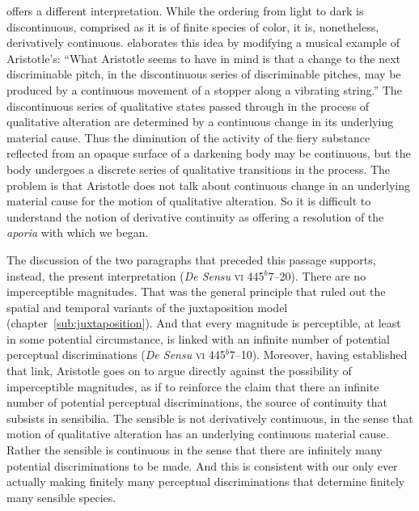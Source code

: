\citet[]{Sorabji:1976fk} offers a different interpretation. While the ordering from light to dark is discontinuous, comprised as it is of finite species of color, it is, nonetheless, derivatively continuous. \citet[80]{Sorabji:1976fk} elaborates this idea by modifying a musical example of Aristotle's: ``What Aristotle seems to have in mind is that a change to the next discriminable pitch, in the discontinuous series of discriminable pitches, may be produced by a continuous movement of a stopper along a vibrating string.'' The discontinuous series of qualitative states passed through in the process of qualitative alteration are determined by a continuous change in its underlying material cause. Thus the diminution of the activity of the fiery substance reflected from an opaque surface of a darkening body may be continuous, but the body undergoes a discrete series of qualitative transitions in the process. The problem is that Aristotle does not talk about continuous change in an underlying material cause for the motion of qualitative alteration. So it is difficult to understand the notion of derivative continuity as offering a resolution of the \emph{aporia} with which we began.

The discussion of the two paragraphs that preceded this passage supports, instead, the present interpretation (\emph{De Sensu} \textsc{vi} 445\( ^{b} \)7--20). There are no imperceptible magnitudes. That was the general principle that ruled out the spatial and temporal variants of the juxtaposition model (chapter~\ref{sub:juxtaposition}). And that every magnitude is perceptible, at least in some potential circumstance, is linked with an infinite number of potential perceptual discriminations (\emph{De Sensu} \textsc{vi} 445\( ^{b} \)7--10). Moreover, having established that link, Aristotle goes on to argue directly against the possibility of imperceptible magnitudes, as if to reinforce the claim that there an infinite number of potential perceptual discriminations, the source of continuity that subsists in sensibilia. The sensible is not derivatively continuous, in the sense that motion of qualitative alteration has an underlying continuous material cause. Rather the sensible is continuous in the sense that there are infinitely many potential discriminations to be made. And this is consistent with our only ever actually making finitely many perceptual discriminations that determine finitely many sensible species.

